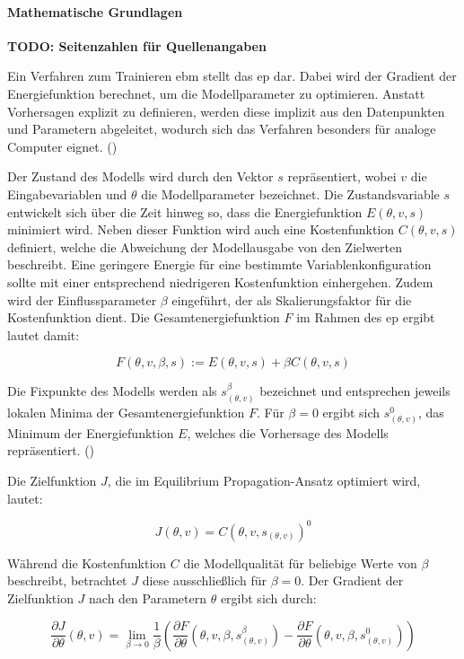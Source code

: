 \paragraph{Mathematische Grundlagen}

\textbf{TODO: Seitenzahlen für Quellenangaben}

Ein Verfahren zum Trainieren \ac{ebm} stellt das \ac{ep} dar. Dabei wird der Gradient der Energiefunktion berechnet, um die Modellparameter zu optimieren. Anstatt Vorhersagen explizit zu definieren, werden diese implizit aus den Datenpunkten und Parametern abgeleitet, wodurch sich das Verfahren besonders für analoge Computer eignet. (\cite{Scellier2017})

Der Zustand des Modells wird durch den Vektor \(s\) repräsentiert, wobei \(v\) die Eingabevariablen und \(\theta\) die Modellparameter bezeichnet. Die Zustandsvariable \(s\) entwickelt sich über die Zeit hinweg so, dass die Energiefunktion \(E(\theta,v,s)\) minimiert wird. Neben dieser Funktion wird auch eine Kostenfunktion \(C(\theta,v,s)\) definiert, welche die Abweichung der Modellausgabe von den Zielwerten beschreibt. Eine geringere Energie für eine bestimmte Variablenkonfiguration sollte mit einer entsprechend niedrigeren Kostenfunktion einhergehen. Zudem wird der Einflussparameter \(\beta\) eingeführt, der als Skalierungsfaktor für die Kostenfunktion dient. Die Gesamtenergiefunktion \(F\) im Rahmen des \ac{ep} ergibt lautet damit:

\[F(\theta,v,\beta,s):=E(\theta,v,s)+\beta C(\theta,v,s)\]

Die Fixpunkte des Modells werden als \(s_{(\theta,v)}^\beta\) bezeichnet und entsprechen jeweils lokalen Minima der Gesamtenergiefunktion \(F\). Für \(\beta=0\) ergibt sich \(s_{(\theta,v)}^0\), das Minimum der Energiefunktion \(E\), welches die Vorhersage des Modells repräsentiert. (\cite{Scellier2017})

Die Zielfunktion \(J\), die im Equilibrium Propagation-Ansatz optimiert wird, lautet:

\[J(\theta,v)=C(\theta,v,s_{(\theta,v)})^0\]

Während die Kostenfunktion \(C\) die Modellqualität für beliebige Werte von \(\beta\) beschreibt, betrachtet \(J\) diese ausschließlich für \(\beta=0\). Der Gradient der Zielfunktion \(J\) nach den Parametern \(\theta\) ergibt sich durch:

\[\frac{\partial J}{\partial \theta}(\theta,v)=\lim\limits_{\beta \to 0}\frac{1}{\beta}\left(\frac{\partial F}{\partial \theta}(\theta,v,\beta,s_{(\theta,v)}^\beta)-\frac{\partial F}{\partial \theta}(\theta,v,\beta,s_{(\theta,v)}^0)\right)\]


